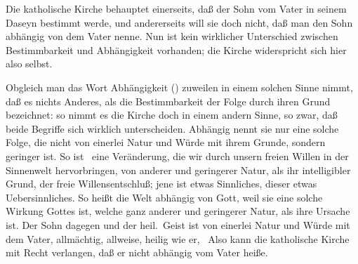  Die katholische Kirche behauptet einerseits, daß der Sohn vom Vater in seinem Daseyn bestimmt werde, und andererseits will sie doch nicht, daß man den Sohn abhängig von dem Vater nenne. Nun ist kein wirklicher Unterschied zwischen Bestimmbarkeit und Abhängigkeit vorhanden; die Kirche widerspricht sich hier also selbst.\par
{} Obgleich man das Wort Abhängigkeit () zuweilen in einem solchen Sinne nimmt, daß es nichts Anderes, als die Bestimmbarkeit der Folge durch ihren Grund bezeichnet: so nimmt es die Kirche doch in einem andern Sinne, so zwar, daß beide Begriffe sich wirklich unterscheiden. Abhängig nennt sie nur eine solche Folge, die nicht von einerlei Natur und Würde mit ihrem Grunde, sondern geringer ist. So ist \zB\ eine Veränderung, die wir durch unsern freien Willen in der Sinnenwelt hervorbringen, von anderer und geringerer Natur, als ihr intelligibler Grund, der freie Willensentschluß; jene ist etwas Sinnliches, dieser etwas Uebersinnliches. So heißt die Welt abhängig von Gott, weil sie eine solche Wirkung Gottes ist, welche ganz anderer und geringerer Natur, als ihre Ursache ist. Der Sohn dagegen und der heil.\ Geist ist von einerlei Natur und Würde mit dem Vater, allmächtig, allweise, heilig wie er, \usw\ Also kann die katholische Kirche mit Recht verlangen, daß er nicht abhängig vom Vater heiße. 

